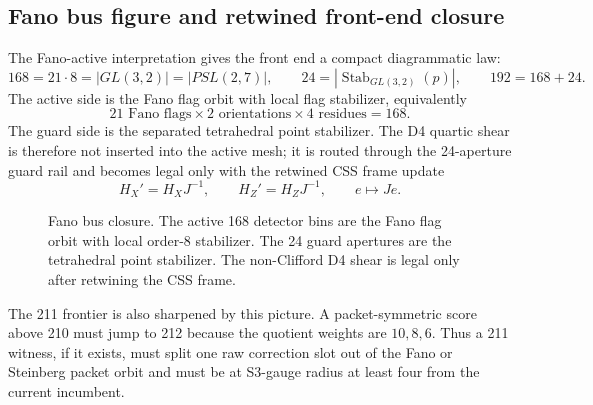 \subsection{Fano bus figure and retwined front-end closure}
\label{sec:bt1430-fano-bus-closure}

The Fano-active interpretation gives the front end a compact diagrammatic law:
\[
168=21\cdot8=|GL(3,2)|=|PSL(2,7)|,
\qquad
24=|\operatorname{Stab}_{GL(3,2)}(p)|,
\qquad
192=168+24.
\]
The active side is the Fano flag orbit with local flag stabilizer, equivalently
\[
21\text{ Fano flags}\times2\text{ orientations}\times4\text{ residues}=168.
\]
The guard side is the separated tetrahedral point stabilizer.  The D4 quartic
shear is therefore not inserted into the active mesh; it is routed through the
24-aperture guard rail and becomes legal only with the retwined CSS frame update
\[
H_X'=H_XJ^{-1},\qquad H_Z'=H_ZJ^{-1},\qquad e\mapsto Je.
\]

\begin{figure}[ht]\centering
{}
\caption{Fano bus closure.  The active 168 detector bins are the Fano flag orbit
with local order-8 stabilizer.  The 24 guard apertures are the tetrahedral point
stabilizer.  The non-Clifford D4 shear is legal only after retwining the CSS
frame.}
\end{figure}

The 211 frontier is also sharpened by this picture.  A packet-symmetric score
above 210 must jump to 212 because the quotient weights are \(10,8,6\).  Thus a
211 witness, if it exists, must split one raw correction slot out of the Fano or
Steinberg packet orbit and must be at S3-gauge radius at least four from the
current incumbent.
